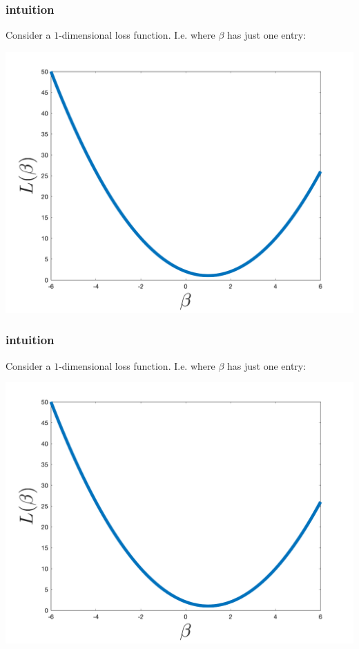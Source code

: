\documentclass[handout,compress]{beamer}
\begin{document}
\begin{frame}[t]
	\frametitle{intuition}
	Consider a $1$-dimensional loss function. I.e. where $\beta$ has just one entry:
	\begin{center}
		\includegraphics[width=.8\textwidth]{1d_example.png}
	\end{center}
\end{frame}

\begin{frame}[t]
	\frametitle{intuition}
	Consider a $1$-dimensional loss function. I.e. where $\beta$ has just one entry:
	\begin{center}
		\includegraphics[width=.8\textwidth]{1d_example.png}
	\end{center}
\end{frame}
\end{document}
